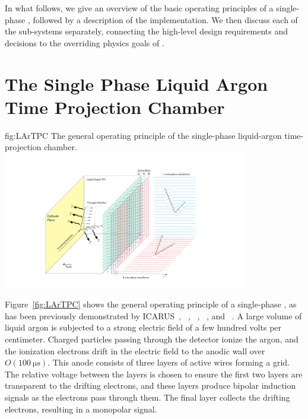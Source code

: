 In what follows, we give an overview of the basic operating principles of a single-phase , followed by a description of the  implementation. We then discuss each of the sub-systems separately, connecting the high-level design requirements and decisions to the overriding physics goals of .

\section{The Single Phase Liquid Argon Time Projection Chamber}
\label{sec:fdsp-exec-splar}

\begin{dunefigure}{fig:LArTPC}
{The general operating principle of the single-phase liquid-argon time-projection chamber.}
\includegraphics[trim={5cm 0 5cm 0},clip,width=0.8\textwidth]{graphics/TheBoPicture.pdf}
\end{dunefigure}

Figure~\ref{fig:LArTPC} shows the general operating principle of a single-phase , as has been previously demonstrated by  ICARUS~\cite{Icarus-T600}, ~\cite{microboone}, ~\cite{Anderson:2012vc}, ~\cite{Cavanna:2014iqa}, and ~\cite{Abi:2017aow}. A large volume of liquid argon is subjected to a strong electric field of a few hundred volts per centimeter. Charged particles passing through the detector ionize the argon, and the ionization electrons drift in the electric field to the anodic wall over $O(\SI{100}{\micro\second})$. This anode consists of three layers of active wires forming a grid. The relative voltage between the layers is chosen to ensure the first two layers are transparent to the drifting electrons, and these layers produce bipolar induction signals as the electrons pass through them. The final layer collects the drifting electrons, resulting in a monopolar signal.

